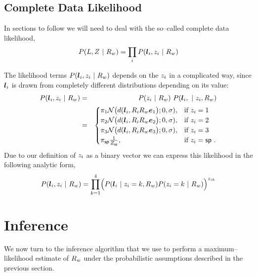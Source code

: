 \subsection{Complete Data Likelihood}

In sections to follow we will need to deal with the so--called
complete data likelihood,
\begin{equation}
  P(\LineSegs,\Indicators ~|~ \SceneR) =
    \prod_i P(\LineSeg_i,\Indicator_i ~|~ \SceneR)
\end{equation}

The likelihood terms $P(\LineSeg_i,\Indicator_i ~|~ \SceneR)$ depends
on the $\Indicator_i$ in a complicated way, since $\LineSeg_i$ is
drawn from completely different distributions depending on its value:
\begin{eqnarray}
  P(\LineSeg_i,\Indicator_i ~|~ \SceneR) &=&
  P(\Indicator_i ~|~ \SceneR)~
  P(\LineSeg_i, ~|~ \Indicator_i, \SceneR)\\
  &=&
  \begin{cases}
    \Mixing_1 
    \NormalDistr\bigr(\dist(\LineSeg_i, \CamR_i\SceneR\ex\bigl); 0,\sigma),
      & \mbox{if } \Indicator_i = 1 \\
    \Mixing_2
    \NormalDistr\bigr(\dist(\LineSeg_i, \CamR_i\SceneR\ey\bigl); 0,\sigma),
      & \mbox{if } \Indicator_i = 2 \\
    \Mixing_3
    \NormalDistr\bigr(\dist(\LineSeg_i, \CamR_i\SceneR\ez\bigl); 0,\sigma),
      & \mbox{if } \Indicator_i = 3 \\
    \Mixing_{\Spurious}
    \frac{1}{Z_\Spurious},
      & \mbox{if } \Indicator_i = \Spurious ~.
  \end{cases}
\end{eqnarray}
Due to our definition of $\Indicator_i$ as a binary vector we can
express this likelihood in the following analytic form,
\begin{equation}
  \label{eq:complete-likelihood}
  P(\LineSeg_i,\Indicator_i ~|~ \SceneR) =
  \prod_{k=1}^4 \Bigl( 
    P(\LineSeg_i ~|~ \Indicator_i=k,\SceneR)
    P(\Indicator_i=k ~|~ \SceneR)
  \Bigr)^{\Indicator_{ik}}
\end{equation}

\section{Inference}

We now turn to the inference algorithm that we use to perform a
maximum--likelihood estimate of $\SceneR$ under the probabilistic
assumptions described in the previous section.

